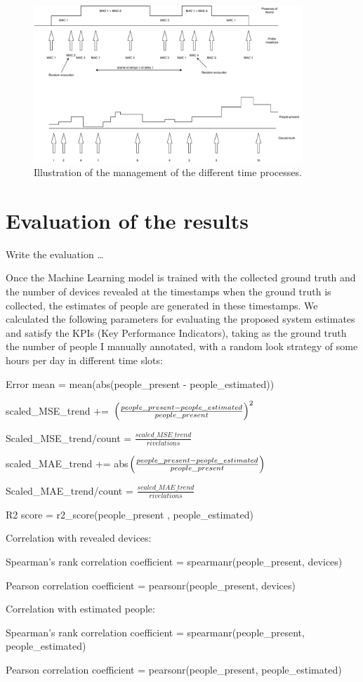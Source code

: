 \begin{figure}[h]
\centering 
\includegraphics[width=0.9\textwidth]{images/timeseries} 
\caption{Illustration of the management of the different time processes.}
\label{fig:timeseries}
\end{figure}


\section{Evaluation of the results}
\label{sec:evalres}
\vspace{0.2 cm} 

Write the evaluation \dots

Once the Machine Learning model is trained with the collected ground truth and the number of devices revealed at the timestamps when the ground truth is collected, the estimates of people are generated in these timestamps. We calculated the following parameters for evaluating the proposed system estimates and satisfy the KPIs (Key Performance Indicators), taking as the ground truth the number of people I manually annotated, with a random look strategy of some hours per day in different time slots:

Error mean = mean(abs(people\_present - people\_estimated))

scaled\_MSE\_trend += $\Bigl(\frac{people\_present - people\_estimated}{people\_present} \Bigr)^{2}$

Scaled\_MSE\_trend/count = $\frac{scaled\_MSE\_trend}{rivelations}$

scaled\_MAE\_trend += abs$\Bigl(\frac{people\_present - people\_estimated}{people\_present} \Bigr)$

Scaled\_MAE\_trend/count = $\frac{scaled\_MAE\_trend}{rivelations}$

R2 score = r2\_score(people\_present , people\_estimated)

Correlation with revealed devices:

Spearman's rank correlation coefficient = spearmanr(people\_present, devices)

Pearson correlation coefficient = pearsonr(people\_present, devices)

Correlation with estimated people:

Spearman's rank correlation coefficient = spearmanr(people\_present, people\_estimated)

Pearson correlation coefficient = pearsonr(people\_present, people\_estimated)
